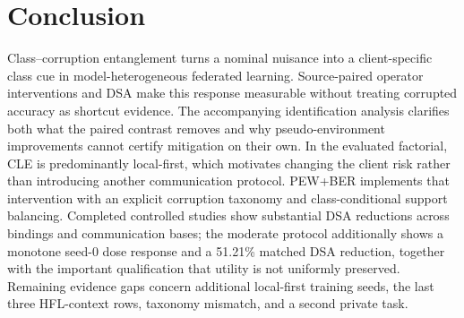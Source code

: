 \section{Conclusion}

Class--corruption entanglement turns a nominal nuisance into a client-specific class cue in model-heterogeneous federated learning. Source-paired operator interventions and DSA make this response measurable without treating corrupted accuracy as shortcut evidence. The accompanying identification analysis clarifies both what the paired contrast removes and why pseudo-environment improvements cannot certify mitigation on their own. In the evaluated factorial, CLE is predominantly local-first, which motivates changing the client risk rather than introducing another communication protocol. PEW+BER implements that intervention with an explicit corruption taxonomy and class-conditional support balancing. Completed controlled studies show substantial DSA reductions across bindings and communication bases; the moderate protocol additionally shows a monotone seed-0 dose response and a 51.21\% matched DSA reduction, together with the important qualification that utility is not uniformly preserved. Remaining evidence gaps concern additional local-first training seeds, the last three HFL-context rows, taxonomy mismatch, and a second private task.

